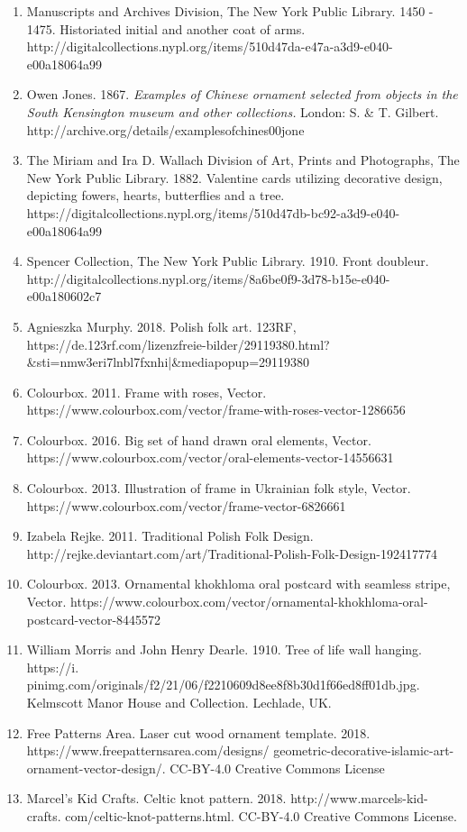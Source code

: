 \begin{enumerate}
    \item{Manuscripts and Archives Division, The New York Public Library. 1450 - 1475. Historiated initial and another coat of arms. http://digitalcollections.nypl.org/items/510d47da-e47a-a3d9-e040-e00a18064a99}
    \item{Owen Jones. 1867. \textit{Examples of Chinese ornament selected from objects in the South Kensington museum and other collections.} London: S. \& T. Gilbert. http://archive.org/details/examplesofchines00jone}
    \item{The Miriam and Ira D. Wallach Division of Art, Prints and Photographs, The New York Public Library. 1882. Valentine cards utilizing decorative design, depicting fowers, hearts, butterflies and a tree. https://digitalcollections.nypl.org/items/510d47db-bc92-a3d9-e040-e00a18064a99}
    \item{Spencer Collection, The New York Public Library. 1910. Front doubleur. http://digitalcollections.nypl.org/items/8a6be0f9-3d78-b15e-e040-e00a180602c7}
    \item {Agnieszka Murphy. 2018. Polish folk art. 123RF, https://de.123rf.com/lizenzfreie-bilder/29119380.html?\&sti=nmw3eri7lnbl7fxnhi|\&mediapopup=29119380}
    \item{Colourbox. 2011. Frame with roses, Vector. https://www.colourbox.com/vector/frame-with-roses-vector-1286656}
    \item{Colourbox. 2016. Big set of hand drawn oral elements, Vector. https://www.colourbox.com/vector/oral-elements-vector-14556631}
    \item{Colourbox. 2013. Illustration of frame in Ukrainian folk style, Vector. https://www.colourbox.com/vector/frame-vector-6826661}
    \item{Izabela Rejke. 2011. Traditional Polish Folk Design. http://rejke.deviantart.com/art/Traditional-Polish-Folk-Design-192417774}
    \item{Colourbox. 2013. Ornamental khokhloma oral postcard with seamless stripe, Vector. https://www.colourbox.com/vector/ornamental-khokhloma-oral-postcard-vector-8445572}

    \item {William Morris and John Henry Dearle. 1910. Tree of life wall hanging.  https://i. pinimg.com/originals/f2/21/06/f2210609d8ee8f8b30d1f66ed8ff01db.jpg. Kelmscott Manor House and Collection. Lechlade, UK.}
    
    \item{Free Patterns Area. Laser cut wood ornament template. 2018. https://www.freepatternsarea.com/designs/ geometric-decorative-islamic-art-ornament-vector-design/. CC-BY-4.0 Creative Commons License}
    \item {Marcel's Kid Crafts. Celtic knot pattern. 2018. http://www.marcels-kid-crafts. com/celtic-knot-patterns.html. CC-BY-4.0 Creative Commons License.}
\end{enumerate}

% 